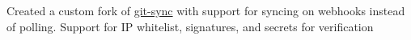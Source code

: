 {Created a custom fork of \href{https://github.com/kubernetes/git-sync}{git-sync} with support for syncing on webhooks instead of polling. Support for IP whitelist, signatures, and secrets for verification}
